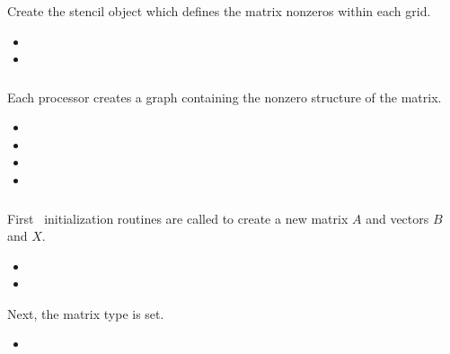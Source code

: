 \documentclass[10pt]{article}
\begin{document}
\subsubsection{}


  Create the stencil object which defines the matrix nonzeros within each grid.

\begin{itemize}
\item {}
\item {}
\end{itemize}

\subsubsection{}


 Each processor creates a graph containing the nonzero structure of
 the matrix.

\begin{itemize}
\item {}
\item {}
\item {}
\item {}
\end{itemize}

\subsubsection{}

First \hypre\ initialization routines are called to create
a new matrix $A$ and vectors $B$ and $X$.

\begin{itemize}
\item {}
\item {}
\end{itemize}

Next, the matrix type is set.

\begin{itemize}
\item {}
\end{itemize}
\end{document}
